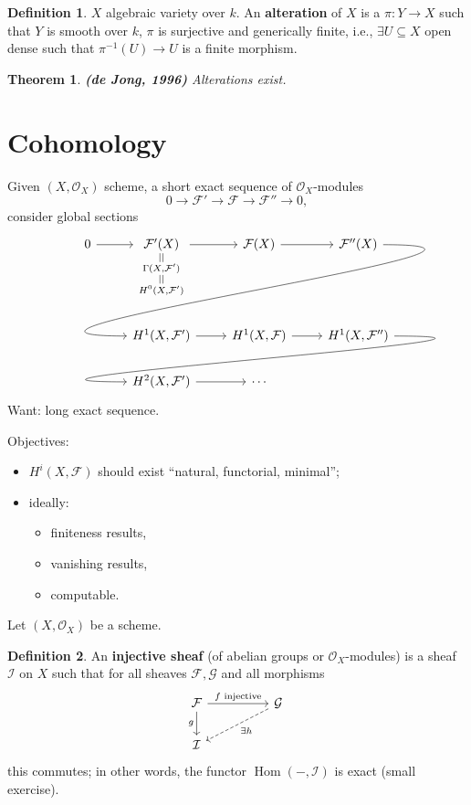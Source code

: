 \documentclass[12pt]{article}
\DeclareMathOperator{\Hom}{Hom}
\newtheorem*{theorem}{Theorem}
\theoremstyle{definition}
\newtheorem*{definition}{Definition}
\begin{document}
\begin{definition}
$X$ algebraic variety over $k$. An \textbf{alteration} of $X$ is a $\pi:Y\rightarrow X$ such that $Y$ is smooth over $k$, $\pi$ is surjective and generically finite, i.e., $\exists U\subseteq X$ open dense such that $\pi^{-1}(U)\rightarrow U$ is a finite morphism.
\end{definition}

\begin{theorem}
\emph{\textbf{(de Jong, 1996)}} Alterations exist.
\end{theorem}

\section{Cohomology}
Given $(X,\mathcal O_X)$ scheme, a short exact sequence of $\mathcal O_X$-modules
\[0\longrightarrow\mathcal F'\longrightarrow\mathcal F\longrightarrow\mathcal F''\longrightarrow0,\]
consider global sections
\[\begin{tikzcd}0\arrow[r]&\underset{\substack{||\\\Gamma(X,\mathcal F')\\||\\H^0(X,\mathcal F')}}{\mathcal F'(X)}\arrow[r]&\mathcal F(X)\arrow[r]&\mathcal F''(X)\arrow[out=0,in=180,looseness=2,overlay,lld]\\&H^1(X,\mathcal F')\arrow[r]&H^1(X,\mathcal F)\arrow[r]&H^1(X,\mathcal F'')\arrow[out=0,in=180, looseness=2,overlay,lld]\\&H^2(X,\mathcal F')\arrow[r]&\cdots\end{tikzcd}\]
Want: long exact sequence.

Objectives:
\begin{itemize}[label=$-$]
\item $H^i(X,\mathcal F)$ should exist ``natural, functorial, minimal'';
\item ideally:
\begin{itemize}[label=$-$]
\item finiteness results,
\item vanishing results,
\item computable.
\end{itemize}
\end{itemize}

Let $(X,\mathcal O_X)$ be a scheme.

\begin{definition}
An \textbf{injective sheaf} (of abelian groups or $\mathcal O_X$-modules) is a sheaf $\mathcal I$ on $X$ such that for all sheaves $\mathcal F,\mathcal G$ and all morphisms
\[\begin{tikzcd}\mathcal F\arrow[rr,"f\text{ injective}"]\arrow[d,"g",swap]&&\mathcal G\arrow[lld,dashed,"\exists h"]\\\mathcal I\end{tikzcd}\]
this commutes; in other words, the functor $\Hom(-,\mathcal I)$ is exact (small exercise).
\end{definition}
\end{document}
